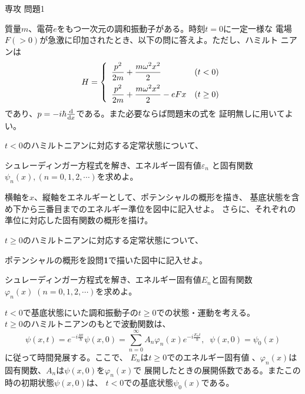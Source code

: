 \documentclass[fleqn]{jbook}
\begin{document}
\begin{question}{専攻 問題1}{}

質量$m$、電荷$e$をもつ一次元の調和振動子がある。時刻$t=0$に一定一様な
電場$F(>0)$が急激に印加されたとき、以下の問に答えよ。ただし、ハミルト
ニアンは
%
\[ H = \left\{\begin{array}{lc}%
         \ds{%
           \frac{p^2}{2m}+\frac{m\omega^2x^2}{2}} & (t<0) \\[3mm]
         \ds{%
           \frac{p^2}{2m}+\frac{m\omega^2x^2}{2}-eFx} & (t \geq 0)
       \end{array}\right. \]
%
であり、$p=-i\hbar{\frac{{\rm d} }{{\rm d} x}}$である。また必要ならば問題末の式を
証明無しに用いてよい。

\begin{subquestions}
\SubQuestion
  $t<0$のハミルトニアンに対応する定常状態について、

  \begin{subsubquestions}
  \SubSubQuestion
    シュレーディンガー方程式を解き、エネルギー固有値$\varepsilon_n$
    と固有関数$\psi_n(x),(n=0,1,2,\cdots)$を求めよ。

  \SubSubQuestion
    横軸を$x$、縦軸をエネルギーとして、ポテンシャルの概形を描き、
    基底状態を含め下から三番目までのエネルギー準位を図中に記入せよ。
    さらに、それぞれの準位に対応した固有関数の概形を描け。

  \end{subsubquestions}

\SubQuestion
  $t\geq 0$のハミルトニアンに対応する定常状態について、

  \begin{subsubquestions}
  \SubSubQuestion
    ポテンシャルの概形を設問{\bf 1}で描いた図中に記入せよ。

  \SubSubQuestion
    シュレーディンガー方程式を解き、エネルギー固有値$E_n$と固有関数
    $\varphi_n(x)\; (n=0,1,2,\cdots)$を求めよ。

  \end{subsubquestions}

\SubQuestion
  $t<0$で基底状態にいた調和振動子の$t \geq 0$での状態・運動を考える。\\
  $t \geq 0$のハミルトニアンのもとで波動関数は、
%
  \[\psi(x,t)=e^{-i\frac{Ht}{\hbar}}\psi(x,0)=\sum_{n=0}^{\infty}
    A_n\varphi_n(x)e^{-i\frac{E_nt}{\hbar}},\;\;\psi(x,0)=\psi_0(x) \]
%
  に従って時間発展する。ここで、 $E_n$は$t \geq 0$でのエネルギー固有値
  、$\varphi_n(x)$は固有関数、$A_n$は$\psi(x,0)$を$\varphi_{n}(x)$で
  展開したときの展開係数である。またこの時の初期状態$\psi(x,0)$は、
  $t<0$での基底状態$\psi_0(x)$である。


\end{subquestions}
\end{question}
\end{document}
